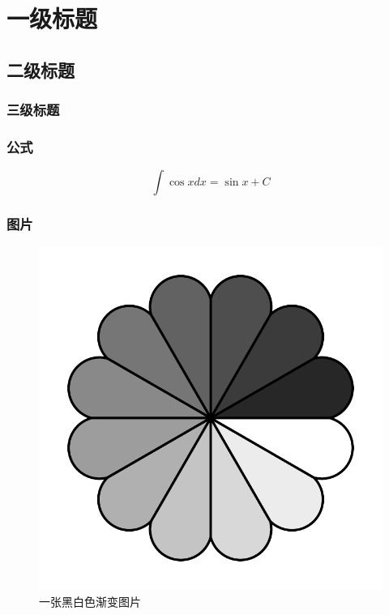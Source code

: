 \documentclass{config}
\date{日期}
\begin{document}
\makecover


\pagestyle{plain}
\setcounter{page}{1}

\section{一级标题}

\subsection{二级标题}

\subsubsection{三级标题}


\subsubsection{公式}

\begin{equation}
    \label{equation}
    \int \cos x dx = \sin x + C
\end{equation}





\subsubsection{图片}

\begin{figure}[h]
    \centering
    \includegraphics[width=0.3\linewidth]{figures/rosette.pdf}
    \caption{一张黑白色渐变图片}
\end{figure}
\end{document}
